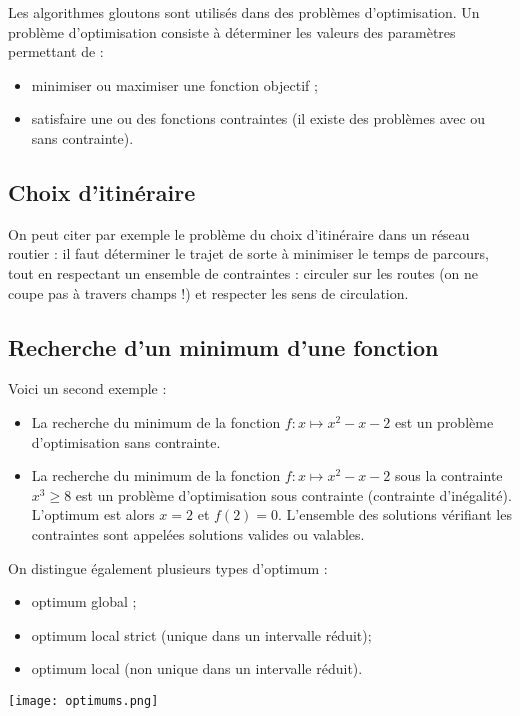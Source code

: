 Les algorithmes gloutons sont utilisés dans des problèmes d’optimisation. Un problème d’optimisation consiste à déterminer les valeurs des paramètres permettant de :
\begin{itemize}
	\item minimiser ou maximiser une fonction objectif ;
	\item satisfaire une ou des fonctions contraintes (il existe des problèmes avec ou sans contrainte).
\end{itemize}

\subsection{Choix d'itinéraire}
 
On peut citer par exemple le problème du choix d’itinéraire dans un réseau routier : il faut déterminer le trajet de sorte à minimiser le temps de parcours, tout en respectant un ensemble de contraintes : circuler sur les routes (on ne coupe pas à travers champs !) et respecter les sens de circulation.

\subsection{Recherche d'un minimum d'une fonction} 
Voici un second exemple : 
\begin{itemize}
	\item 	La recherche du minimum de la fonction $f:x \longmapsto x^2-x-2$ est un problème d’optimisation sans contrainte.
	\item		La recherche du minimum de la fonction $f:x \longmapsto x^2-x-2$ sous la contrainte $x^3\geq8$ est un problème d’optimisation sous contrainte (contrainte d’inégalité). L’optimum est alors $x=2$ et $f(2)=0$. L’ensemble des solutions vérifiant les contraintes sont appelées solutions valides ou valables.
\end{itemize}


\begin{minipage}{.6\textwidth}
On distingue également plusieurs types d’optimum :
\begin{itemize}
	\item optimum global ;
	\item	optimum local strict (unique dans un intervalle réduit);
	\item	optimum local (non unique dans un intervalle réduit).
\end{itemize}
\end{minipage}
\hfill
\begin{minipage}{.35\textwidth}
\texttt{[image: optimums.png]}
\end{minipage}

